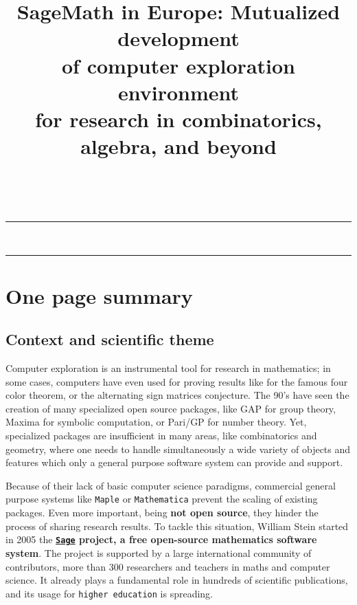 \documentclass[a4,12pt]{amsart}
\title[SageMath in Europe]{SageMath in Europe: Mutualized development\\
  of computer exploration environment\\
  for research in combinatorics, algebra, and beyond
}
\date{}
\newcommand{\sage}{\href{http://www.sagemath.org/}{\texttt{Sage}}\xspace}
\newcommand{\TODO}[2][To do: ]{{\textcolor{red}{\textbf{#1#2}}}}
\begin{document}
\ \vspace{-1.5cm}
\hrule
\medskip
\maketitle
\ \vspace{-1cm}
\hrule




\section{One page summary}

\subsection{Context and scientific theme}

Computer exploration is an instrumental tool for research in
mathematics; in some cases, computers have even used for proving
results like for the famous four color theorem, or the alternating
sign matrices conjecture.
The 90's have seen the creation of many specialized open source
packages, like GAP for group theory, Maxima for symbolic computation,
or Pari/GP for number theory.  Yet, specialized packages are
insufficient in many areas, like combinatorics and geometry, where one
needs to handle simultaneously a wide variety of objects and features
which only a general purpose software system can provide and support.

Because of their lack of basic computer science paradigms, commercial
general purpose systems like \texttt{Maple} or \texttt{Mathematica}
prevent the scaling of existing packages. Even more important, being
\textbf{not open source}, they hinder the process of sharing research
results. To tackle this situation, William Stein started in 2005 the
\textbf{\sage project, a free open-source mathematics software
  system}. The project is supported by a large international
community of contributors, more than 300 researchers and teachers
in maths and computer science. It already plays a fundamental role in
hundreds of scientific publications, and its usage for \texttt{higher
  education} is spreading.
\end{document}
